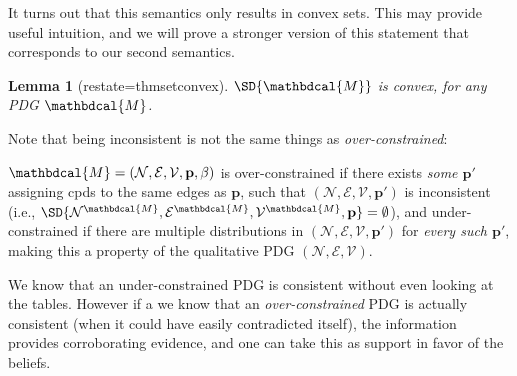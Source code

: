 \documentclass{article}
\theoremstyle{plain}
\newtheorem{lemma}[theorem]{Lemma}
\theoremstyle{definition}
\theoremstyle{remark}
\newcommand\mat[1]{\mathbf{#1}}
\newcommand{\notation}[2][]{#1}
\renewcommand{\notation}[2][]{{\color{notationcolor} #2}}
\newcommand{\V}{\mathcal V}
\newcommand{\N}{\mathcal N}
\newcommand{\Ed}{\mathcal E}
\newcommand{\pdgvars}[1][]{(\N#1, \Ed#1, \V#1, \mat p#1, \beta#1)}
\newcommand{\dg}[1]{\mathbdcal{#1}}
\numberwithin{equation}{section}
\begin{document}
	\begin{vfull}
		It turns out that this semantics only results in convex sets. This may provide useful intuition, and we will prove a stronger version of this statement that corresponds to our second semantics.
		\begin{lemma}[restate=thmsetconvex] 
			\label{prop:convex}
			$\SD{\dg M}$ is convex, for any PDG $\dg M$.
		\end{lemma}
	
		Note that being inconsistent is not the same things as \emph{over-constrained}: 	
		\begin{defn}
			$\dg M = \pdgvars[]$ is over-constrained if there exists
			  \emph{some $\mat p'$} assigning cpds to the same edges as
			  $\mat p$, such that $(\N, \Ed, \V, \mat p')$ is inconsistent
			  \notation{(i.e., $\SD{\N^\dg M, \Ed^\dg M, \V^\dg M, \mat p}
				= \emptyset$)}, and under-constrained if there are
			  multiple distributions in $(\N, \Ed, \V, \mat p')$ for
			  \emph{every such $\mat p'$}, making this a property of the
			  qualitative PDG $(\N, \Ed, \V)$.  
		\end{defn}

		We know that an under-constrained PDG is consistent without even looking at the tables. However if a we know that an \emph{over-constrained} PDG is actually consistent (when it could have easily contradicted itself), the information provides corroborating evidence, and one can take this as support in favor of the beliefs. 
	\end{vfull}
        
\end{document}
